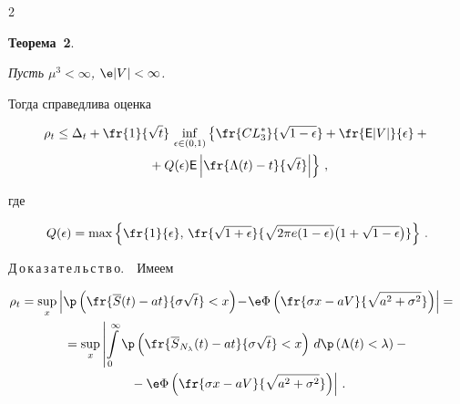 \begin{multicols}{2}
\noindent


\textbf{Теорема~2}. {\it Пусть $\mu^3<\infty$, $\e |V| < \infty$.


Тогда справедлива оценка


\begin{multline*}


\rho_t \leq \Delta_t


+\fr{1}{\sqrt{t}}\,\inf_{\epsilon\in(0,1)}\left\{\fr{CL_3\*}{\sqrt{1-\epsilon}}+\fr{{\sf


E}|V|}{\epsilon}+{}\right.\\


\left.{}+Q(\epsilon){\sf


E}\left |\fr{\Lambda(t)-t}{\sqrt{t}}\right |\right\}\,,


\end{multline*}


где}


$$


Q(\epsilon)=\max\left\{\fr{1}{\epsilon},\,\fr{\sqrt{1+\epsilon}}{\sqrt{2\pi


e(1-\epsilon)}\big(1+\sqrt{1-\epsilon}\big)}\right\}\,.


$$





\smallskip





Д\,о\,к\,а\,з\,а\,т\,е\,л\,ь\,с\,т\,в\,о.\ \, Имеем


\begin{multline*}


\!\!\!\!\rho_t=\sup_x \left| \p\left(\fr{\overline{S}(t)


-at}{{\sigma\sqrt{t}}}<x\right)\!-\!\e \Phi\left( \fr{\sigma x -


aV}{{\sqrt{a^2 + \sigma^2}}}\right) \right|={}


\\


{} =\sup_x


\left| \int\limits_0^\infty


\p\left(\fr{\overline{S}_{N_\lambda}(t)


-at}{{\sigma\sqrt{t}}} < x\right)\,d\p \left(\Lambda(t) <


\lambda\right) -{}\right.\\


\left.{}- \e \Phi\left(\fr{\sigma x - aV}{{\sqrt{a^2 +


\sigma^2}}}\right)\right|\,.



\end{multline*}
\end{multicols}
